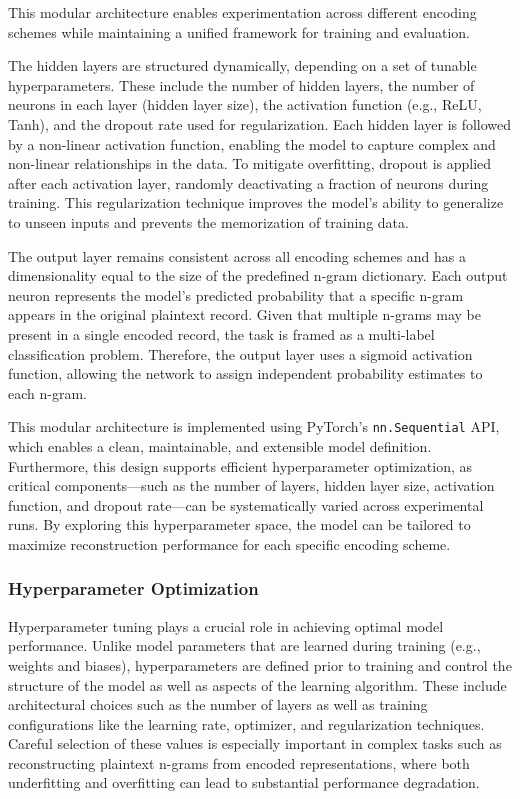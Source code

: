 This modular architecture enables experimentation across different encoding schemes while maintaining a unified framework for training and evaluation.

The hidden layers are structured dynamically, depending on a set of tunable hyperparameters.
These include the number of hidden layers, the number of neurons in each layer (hidden layer size), the activation function (e.g., ReLU, Tanh), and the dropout rate used for regularization.
Each hidden layer is followed by a non-linear activation function, enabling the model to capture complex and non-linear relationships in the data.
To mitigate overfitting, dropout is applied after each activation layer, randomly deactivating a fraction of neurons during training.
This regularization technique improves the model's ability to generalize to unseen inputs and prevents the memorization of training data.

The output layer remains consistent across all encoding schemes and has a dimensionality equal to the size of the predefined n-gram dictionary.
Each output neuron represents the model's predicted probability that a specific n-gram appears in the original plaintext record.
Given that multiple n-grams may be present in a single encoded record, the task is framed as a multi-label classification problem.
Therefore, the output layer uses a sigmoid activation function, allowing the network to assign independent probability estimates to each n-gram.

This modular architecture is implemented using PyTorch's \texttt{nn.Sequential} API, which enables a clean, maintainable, and extensible model definition.
Furthermore, this design supports efficient hyperparameter optimization, as critical components—such as the number of layers, hidden layer size, activation function, and dropout rate—can be systematically varied across experimental runs.
By exploring this hyperparameter space, the model can be tailored to maximize reconstruction performance for each specific encoding scheme.


\subsubsection{Hyperparameter Optimization}

Hyperparameter tuning plays a crucial role in achieving optimal model performance.
Unlike model parameters that are learned during training (e.g., weights and biases), hyperparameters are defined prior to training and control the structure of the model as well as aspects of the learning algorithm.
These include architectural choices such as the number of layers as well as training configurations like the learning rate, optimizer, and regularization techniques.
Careful selection of these values is especially important in complex tasks such as reconstructing plaintext n-grams from encoded representations, where both underfitting and overfitting can lead to substantial performance degradation.

